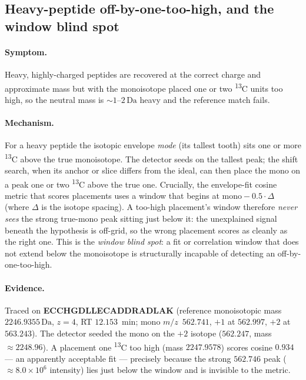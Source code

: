 \documentclass[11pt]{article}
\newcommand{\Da}{\,\text{Da}}
\newcommand{\Cthirteen}{\textsuperscript{13}C}
\newcommand{\mz}{\ensuremath{m/z}}
\newcommand{\zeq}[1]{\ensuremath{z{=}#1}}
\begin{document}
\subsection{Heavy-peptide off-by-one-too-high, and the window blind spot}
\label{sec:walkback}

\paragraph{Symptom.} Heavy, highly-charged peptides are recovered at the correct charge and
approximate mass but with the monoisotope placed one or two \Cthirteen{} units too high, so the
neutral mass is $\sim 1$--$2\Da$ heavy and the reference match fails.

\paragraph{Mechanism.} For a heavy peptide the isotopic envelope \emph{mode} (its tallest tooth)
sits one or more \Cthirteen{} above the true monoisotope. The detector seeds on the tallest peak;
the shift search, when its anchor or slice differs from the ideal, can then place the mono on a
peak one or two \Cthirteen{} above the true one. Crucially, the envelope-fit cosine metric that
scores placements uses a window that begins at $\text{mono} - 0.5\cdot\Delta$ (where $\Delta$ is
the isotope spacing). A too-high placement's window therefore \emph{never sees} the strong true-mono
peak sitting just below it: the unexplained signal beneath the hypothesis is off-grid, so the
wrong placement scores as cleanly as the right one. This is the \emph{window blind spot}: a fit or
correlation window that does not extend below the monoisotope is structurally incapable of
detecting an off-by-one-too-high.

\paragraph{Evidence.} Traced on \textbf{ECCHGDLLECADDRADLAK} (reference monoisotopic mass
$2246.9355\Da$, \zeq{4}, RT $12.153$~min; mono \mz\ $562.741$, $+1$ at $562.997$, $+2$ at
$563.243$). The detector seeded the mono on the $+2$ isotope ($562.247$, mass $\approx 2248.96$).
A placement one \Cthirteen{} too high (mass $2247.9578$) scores cosine $0.934$ --- an apparently
acceptable fit --- precisely because the strong $562.746$ peak ($\approx\!8.0\times10^{6}$
intensity) lies just below the window and is invisible to the metric.
\end{document}
